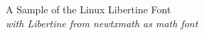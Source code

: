 \documentclass[11pt]{article}
\begin{document}
{\LARGE \noindent A Sample of the Linux Libertine Font}\\

{\large \noindent \textit{with Libertine from newtxmath as math font}}\\[5pt]


\end{document}
